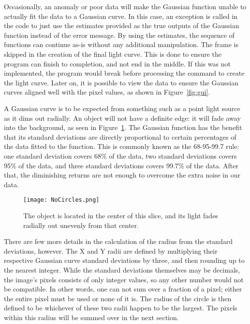 Occasionally, an anomaly or poor data will make the Gaussian function unable to actually fit the data to a Gaussian curve. In this case, an exception is called in the code to just use the estimates provided as the true outputs of the Gaussian function instead of the error message. By using the estimates, the sequence of functions can continue as-is without any additional manipulation. The frame is skipped in the creation of the final light curve. This is done to ensure the program can finish to completion, and not end in the middle. If this was not implemented, the program would break before processing the command to create the light curve. Later on, it is possible to view the data to ensure the Gaussian curves aligned well with the pixel values, as shown in Figure~\ref{fig:gui}.

A Gaussian curve is to be expected from something such as a point light source as it dims out radially. An object will not have a definite edge: it will fade away into the background, as seen in Figure~\ref{fig:NoCircles}. The Gaussian function has the benefit that its standard deviations are directly proportional to certain percentages of the data fitted to the function. This is commonly known as the 68-95-99.7 rule: one standard deviation covers 68\% of the data, two standard deviations covers 95\% of the data, and three standard deviations covers 99.7\% of the data. After that, the diminishing returns are not enough to overcome the extra noise in our data.

\begin{figure}[ht!]
	\centering
	\texttt{[image: NoCircles.png]}
	\caption{The object is located in the center of this slice, and its light fades radially out unevenly from that center.}
	\label{fig:NoCircles}
\end{figure}

There are few more details in the calculation of the radius from the standard deviations, however. The X and Y radii are defined by multiplying their respective Gaussian curve standard deviations by three, and then rounding up to the nearest integer. While the standard deviations themselves may be decimals, the image's pixels consists of only integer values, so any other number would not be compatible. In other words, one can not sum over a fraction of a pixel; either the entire pixel must be used or none of it is. The radius of the circle is then defined to be whichever of these two radii happen to be the largest. The pixels within this radius will be summed over in the next section. 

